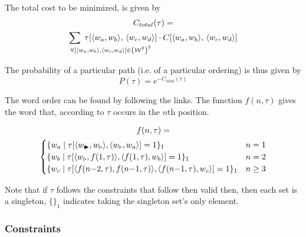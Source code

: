 \documentclass[twocolumn]{article}
\begin{document}
The total cost to be minimized, is given by
\begin{multline*}
 C_{total}(\tau)= \\
	 \sum_{\mathrlap{\!\!\!\!\forall\left[\langle w_{a},w_{b}\rangle,\langle w_{c},w_{d}\rangle\right]\in\left(\W^{2}\right)^{2}
 	}}
 	\;\tau[\langle w_{a},w_{b}\rangle,\,\langle w_{c},w_{d}\rangle] \cdot C[\langle w_{a},w_{b}\rangle,\,\langle w_{c},w_{d}\rangle]
\end{multline*}

\begin{comment}
\begin{multline*}
C_{total}(\tau)= 
\sum_{\mathclap{
		\left[w_{ab},w_{cd}\right]\in\left(\W^{2}\right)^{2}
	}}
	\;\tau[w_{ab},w_{cd}] \cdot C[w_{ab},w_{cd}]
\end{multline*}
\end{comment}

The probability of a particular path (i.e. of a particular ordering)
is thus given by 
\begin{equation*}
P(\tau)=e^{-C_{total}(\tau)}
\end{equation*}

The word order can be found by following the links. The function 
$f(n,\tau)$ gives the word that, according to $\tau$ occurs in the $n$th position.

\begin{multline*}
f(n,\tau)= \\
\begin{cases}
\{w_{a}\mid\tau[\langle w_{\blacktriangleright},w_{\triangleright}\rangle,\langle w_{\triangleright},w_{a}\rangle]=1\}_{1} & n=1\\
\{w_{b}\mid\tau[\langle w_{\triangleright},f(1,\tau)\rangle,\langle f(1,\tau),w_{b}\rangle]=1\}_{1} & n=2\\
\{w_{c}\mid\tau[\langle f(n{-}2,\tau),f(n{-}1,\tau)\rangle,\langle f(n{-}1,\tau),w_{c}\rangle]=1\}_{1} & n\ge3
\end{cases}
\end{multline*}


Note that if $\tau$ follows the constraints that follow then valid then, then
each set is a singleton, $\{\}_{1}$ indicates taking the singleton set's only element.




\subsubsection{Constraints}
\end{document}
